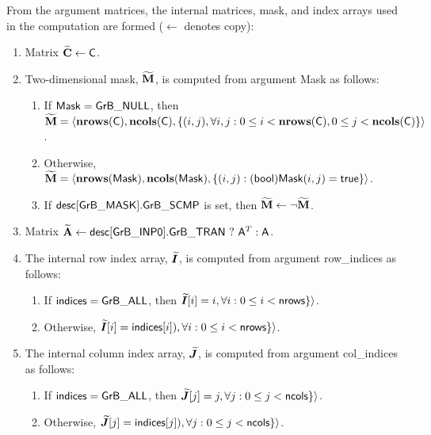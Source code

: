 From the argument matrices, the internal matrices, mask, and index arrays used in 
the computation are formed ($\leftarrow$ denotes copy):
\begin{enumerate}
	\item Matrix ${\bf \widetilde{C}} \leftarrow {\sf C}$.

	\item Two-dimensional mask, ${\bf \widetilde{M}}$, is computed from 
    argument {\sf Mask} as follows:
	\begin{enumerate}

		\item	If ${\sf Mask} = {\sf GrB\_NULL}$, then ${\bf \widetilde{M}} = 
        \langle \bold{nrows}({\sf C}), \bold{ncols}({\sf C}), \{(i,j), 
        \forall i,j : 0 \leq i <  \bold{nrows}({\sf C}), 0 \leq j < 
        \bold{ncols}({\sf C}) \} \rangle$.

		\item	Otherwise, ${\bf \widetilde{M}} = \langle 
        \bold{nrows}({\sf Mask}), \bold{ncols}({\sf Mask}), \{(i,j) : 
        ({\sf bool}){\sf Mask}(i,j) = {\sf true}\} \rangle$.

		\item	If ${\sf desc[GrB\_MASK].GrB\_SCMP}$ is set, then 
        ${\bf \widetilde{M}} \leftarrow \neg {\bf \widetilde{M}}$.

	\end{enumerate}

	\item Matrix ${\bf \widetilde{A}} \leftarrow 
    {\sf desc[GrB\_INP0].GrB\_TRAN} \ ? \ {\sf A}^T : {\sf A}$.
    
    \item The internal row index array, $\bm{\widetilde{I}}$, is computed from 
    argument {\sf row\_indices} as follows:
	\begin{enumerate}
		\item	If ${\sf indices} = {\sf GrB\_ALL}$, then 
        $\bm{\widetilde{I}}[i] = i, \forall i : 0 \leq i < {\sf nrows} \}
        \rangle$.

		\item	Otherwise, $\bm{\widetilde{I}}[i] = {\sf indices}[i]), 
        \forall i : 0 \leq i < {\sf nrows} \} \rangle$.
    \end{enumerate}
    
    \item The internal column index array, $\bm{\widetilde{J}}$, is computed from 
    argument {\sf col\_indices} as follows:
	\begin{enumerate}
		\item	If ${\sf indices} = {\sf GrB\_ALL}$, then 
        $\bm{\widetilde{J}}[j] = j, \forall j : 0 \leq j < {\sf ncols} \}
        \rangle$.

		\item	Otherwise, $\bm{\widetilde{J}}[j] = {\sf indices}[j]), 
        \forall j : 0 \leq j < {\sf ncols} \} \rangle$.
    \end{enumerate}
\end{enumerate}

